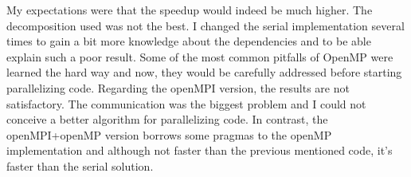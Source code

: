 \documentclass[times, 10pt,twocolumn]{article}
\begin{document}
	My expectations were that the speedup would indeed be much higher. The decomposition used was not the best. I changed the serial implementation several times to gain a bit more knowledge about the dependencies and to be able explain such a poor result. Some of the most common pitfalls of OpenMP were learned the hard way and now, they would be carefully addressed before starting parallelizing code. Regarding the openMPI version, the results are not satisfactory. The communication was the biggest problem and I could not conceive a better algorithm for parallelizing code. In contrast, the openMPI+openMP version borrows some pragmas to the openMP implementation and although not faster than the previous mentioned code, it's faster than the serial solution.
\end{document}
